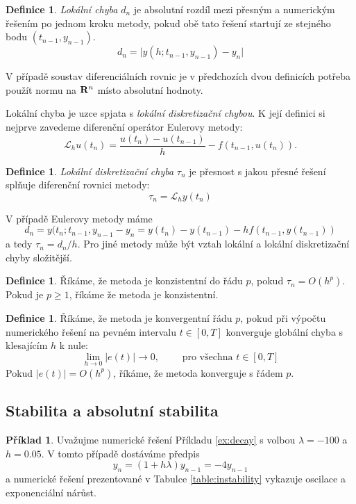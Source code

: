 \documentclass[a4paper, 12pt]{book}
\theoremstyle{definition}
\newtheorem{definition}[theorem]{Definice}
\newtheorem{example}[theorem]{Příklad}
\def\to{\rightarrow}
\def\Real{{\rm\bf R}}
\def\abs#1{\lvert#1\rvert}
\def\df#1{\emph{#1}}
\begin{document}
\begin{definition}
 \df{Lokální chyba} $d_n$ je absolutní rozdíl mezi přesným a numerickým řešením po jednom kroku metody, pokud obě tato řešení startují ze
 stejného bodu $(t_{n-1}, y_{n-1})$.
 \[
   d_n = \abs{ y(h; t_{n-1}, y_{n-1}) - y_n}
 \]
\end{definition}

V případě soustav diferenciálních rovnic je v předchozích dvou definicích potřeba použít normu na $\Real^n$ místo absolutní hodnoty.

Lokální chyba je uzce spjata s \df{lokální diskretizační chybou}. K její definici si nejprve zavedeme diferenční operátor Eulerovy metody:
\[
 \mathcal{L}_h u(t_n) = \frac{u(t_n) - u(t_{n-1})}{h} - f(t_{n-1}, u(t_n)).
\]
\begin{definition}
 \df{Lokální diskretizační chyba} $\tau_n$ je přesnost s jakou přesné řešení splňuje diferenční rovnici metody:
 \[
   \tau_n = \mathcal{L}_h y(t_n)
 \]
\end{definition}

V případě Eulerovy metody máme
\[
  d_n = y(t_n; t_{n-1}, y_{n-1} - y_n =y(t_n) - y(t_{n-1}) - hf(t_{n-1}, y(t_{n-1}))
\]
a tedy $\tau_n = d_n/h$. Pro jiné metody může být vztah lokální a lokální diskretizační chyby složitější.


\begin{definition}
 Říkáme, že metoda je konzistentní do řádu $p$, pokud $\tau_n = O (h^p)$. Pokud je $p\ge 1$, říkáme že metoda je konzistentní.
\end{definition}

\begin{definition}
 Říkáme, že metoda je konvergentní řádu $p$, pokud při výpočtu numerického řešení na pevném intervalu $t \in [0,T]$ konverguje globální chyba s klesajícím $h$ k nule:
 \[
    \lim_{h\to 0} \abs{e(t)} \to 0,\qquad \text{ pro všechna $t\in [0,T]$}
 \]
 Pokud $\abs{e(t)} = O(h^p)$, říkáme, že metoda konverguje s řádem $p$.
\end{definition}

\subsection{Stabilita a absolutní stabilita}
\begin{example}
Uvažujme numerické řešení Příkladu  \ref{ex:decay} s volbou $\lambda=-100$ a $h=0.05$. V tomto případě dostáváme předpis
\[
  y_n = (1 + h\lambda) y_{n-1} = -4 y_{n-1}
\]
a numerické řešení prezentované v Tabulce \ref{table:instability} vykazuje oscilace a exponenciální nárůst. 
\end{example}
\end{document}
